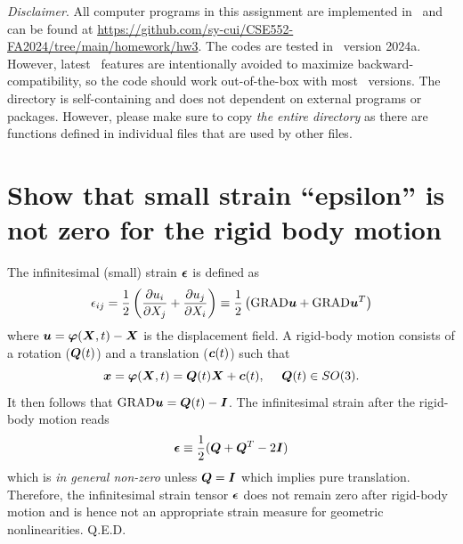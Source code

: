 \pagestyle{fancy}
\setlength{\headheight}{16pt}
\fancyhead{} %
\fancyfoot{} %
\fancyfoot[C]{\thepage}

\newcommand{\Fint}{\ensuremath{\bv{F}^{\textrm{int}}}}
\newcommand{\Fext}{\ensuremath{\bv{F}^{\textrm{ext}}}}

\noindent \emph{Disclaimer}. All computer programs in this assignment are implemented in \matlab~and can be found at \url{https://github.com/sy-cui/CSE552-FA2024/tree/main/homework/hw3}. 
The codes are tested in \matlab~version 2024a. 
However, latest \matlab~features are intentionally avoided to maximize backward-compatibility, so the code should work out-of-the-box with most \matlab~versions. 
The directory is self-containing and does not dependent on external programs or packages. 
However, please make sure to copy \emph{the entire directory} as there are functions defined in individual files that are used by other files. 

\section{Show that small strain ``epsilon'' is not zero for the rigid body motion}
The infinitesimal (small) strain $\bm{\epsilon}$ is defined as 
\begin{equation}
    \epsilon_{ij} = \frac{1}{2}\left(\frac{\partial u_i}{\partial X_j} + \frac{\partial u_j}{\partial X_i}\right) \equiv \frac{1}{2}\left(\textrm{GRAD} \bm{u} + \textrm{GRAD} \bm{u}^T\right)
\end{equation}
where $\bm{u} = \bm{\varphi}(\bm{X}, t) - \bm{X}$ is the displacement field.
A rigid-body motion consists of a rotation ($\bm{Q}(t)$) and a translation ($\bm{c}(t)$) such that 
\begin{equation}\label{eqn:hw3_p1_rigid}
    \bm{x} = \bm{\varphi}(\bm{X}, t) = \bm{Q}(t) \bm{X} + \bm{c}(t), ~~~~ \bm{Q}(t)\in SO(3).
\end{equation}
It then follows that $\textrm{GRAD}\bm{u} = \bm{Q}(t) - \bm{I}$. 
The infinitesimal strain after the rigid-body motion reads
\begin{equation}
    \bm{\epsilon} \equiv \frac{1}{2}(\bm{Q} + \bm{Q}^T - 2\bm{I})
\end{equation}
which is \emph{in general non-zero} unless $\bm{Q} = \bm{I}$ which implies pure translation.
Therefore, the infinitesimal strain tensor $\bm{\epsilon}$ does not remain zero after rigid-body motion and is hence not an appropriate strain measure for geometric nonlinearities. Q.E.D.


